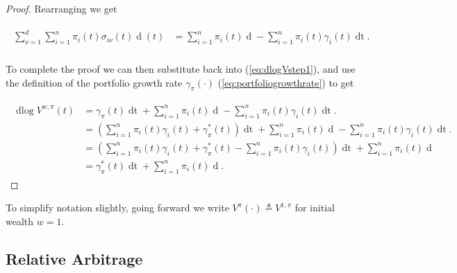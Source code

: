 \documentclass[british]{amsart} \usepackage{lmodern}
\numberwithin{equation}{section} \numberwithin{figure}{section}
\theoremstyle{plain} \newtheorem{thm}{\protect\theoremname}[section]
\theoremstyle{definition} \newtheorem{defn}[thm]{\protect\definitionname}
\theoremstyle{plain} \newtheorem{assumption}[thm]{\protect\assumptionname}
\theoremstyle{plain} \newtheorem{lem}[thm]{\protect\lemmaname}
\theoremstyle{plain} \newtheorem{prop}[thm]{\protect\propositionname}
\theoremstyle{remark} \newtheorem{rem}[thm]{\protect\remarkname}
\theoremstyle{plain} \newtheorem{cor}[thm]{\protect\corollaryname}
\renewcommand{\d}[1]{\mathop{\mathrm{d}{#1}}}
\newcommand{\defeq}{\mathop{\triangleq}} \newcommand{\almostsurely}{\text{a.s.}}
\newcommand{\V}{V^{w,\pi}}
\begin{document}
\begin{proof}
  Rearranging we get 

  \begin{gather*}
    \begin{split}
       \sum_{\nu=1}^{d} \sum_{i=1}^{n} 
            \pi_{i}(t) \sigma_{i\nu}(t) \d{W_{\nu}}(t) &=
       \sum_{i=1}^{n} \pi_{i}(t) \d{\log{X_{i}(t)}} -
       \sum_{i=1}^{n} \pi_{i}(t) \gamma_{i}(t) \d{t}. \\
    \end{split}
  \end{gather*}

  To complete the proof we can then substitute back into (\ref{eq:dlogVstep1}),
  and use the  definition of the portfolio growth rate $\gamma_{\pi}(\cdot)$
  (\ref{eq:portfoliogrowthrate}) to get 

  \begin{gather}
    \begin{split}
      \d\log{\V(t)} 
      &=
        \gamma_{\pi}(t) \d{t} +
        \sum_{i=1}^{n} \pi_{i}(t) \d{\log{X_{i}(t)}} -
        \sum_{i=1}^{n} \pi_{i}(t) \gamma_{i}(t) \d{t}. \\
      &=
        \left( 
            \sum_{i=1}^{n} \pi_{i}(t)\gamma_{i}(t) + \gamma_{\pi}^{*}(t) 
        \right) \d{t} +
        \sum_{i=1}^{n} \pi_{i}(t) \d{\log{X_{i}(t)}} -
        \sum_{i=1}^{n} \pi_{i}(t) \gamma_{i}(t) \d{t}. \\
       &=
        \left( 
            \sum_{i=1}^{n} \pi_{i}(t)\gamma_{i}(t) 
            + \gamma_{\pi}^{*}(t) 
            - \sum_{i=1}^{n} \pi_{i}(t) \gamma_{i}(t)
        \right) \d{t} +
        \sum_{i=1}^{n} \pi_{i}(t) \d{\log{X_{i}(t)}} \\
       &=
        \gamma_{\pi}^{*}(t)\d{t} +
        \sum_{i=1}^{n} \pi_{i}(t) \d{\log{X_{i}(t)}}.
    \end{split}
  \end{gather}

\end{proof}

To simplify notation slightly, going forward we write $V^{\pi}(\cdot) \defeq V^{1,\pi}$ for initial wealth $w=1$.

\newpage




\subsection{Relative Arbitrage}
\end{document}

